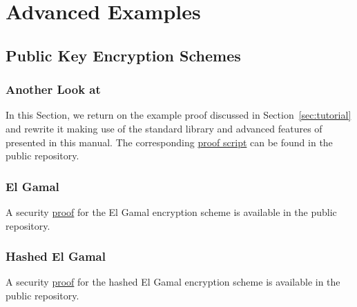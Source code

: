
\chapter{Advanced Examples}

\section{Public Key Encryption Schemes}
\subsection{Another Look at \citet{br93}}
In this Section, we return on the example proof discussed in
Section~\ref{sec:tutorial} and rewrite it making use of the standard library and
advanced features of \EasyCrypt presented in this manual. The corresponding
\EasyCrypt \href{file:../examples/br93.ec}{proof script} can be found in the
public repository.

\subsection{El Gamal}
A security \href{file:../examples/elgamal.ec}{proof} for the El Gamal encryption scheme is available in the public
repository.

\subsection{Hashed El Gamal}
A security \href{file:../examples/hashed_elgamal.ec}{proof} for the hashed El Gamal encryption scheme is available in the
public repository.




